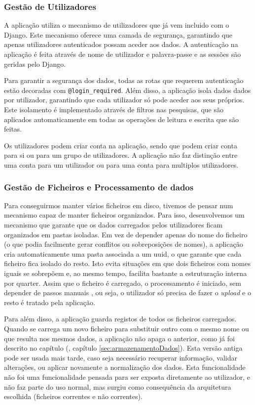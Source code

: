 \subsubsection{Gestão de Utilizadores}

A aplicação utiliza o mecanismo de utilizadores que já vem incluido com o Django. Este mecanismo oferece uma camada de segurança, garantindo que apenas utilizadores autenticados possam aceder aos dados. A autenticação na aplicação é feita através de nome de utilizador e palavra-passe e as sessões são geridas pelo Django.

Para garantir a segurança dos dados, todas as rotas que requerem autenticação estão decoradas com \texttt{@login\_required}. Além disso, a aplicação isola dados dados por utilizador, garantindo que cada utilizador só pode aceder aos seus próprios. Este isolamento é implementado através de filtros nas pesquisas, que são aplicados automaticamente em todas as operações de leitura e escrita que são feitas.

Os utilizadores podem criar conta na aplicação, sendo que podem criar conta para si ou para um grupo de utilizadores. A aplicação não faz distinção entre uma conta para um utilizador ou para uma conta para multiplos utilizadores.

\subsubsection{Gestão de Ficheiros e Processamento de dados}

Para conseguirmos manter vários ficheiros em disco, tivemos de pensar num mecanismo capaz de manter ficheiros organizados. Para isso, desenvolvemos um mecanismo que garante que os dados carregados pelos utilizadores ficam organizados em pastas isoladas. Em vez de depender apenas do nome do ficheiro (o que podia facilmente gerar conflitos ou sobreposições de nomes), a aplicação cria automaticamente uma pasta associada a um \gls{uuid}, o que garante que cada ficheiro fica isolado do resto. Isto evita situações em que dois ficheiros com nomes iguais se sobrepõem e, ao mesmo tempo, facilita bastante a estruturação interna por \gls{quarter}. Assim que o ficheiro é carregado, o processamento é iniciado, sem depender de passos manuais , ou seja, o utilizador só precisa de fazer o \textit{upload} e o resto é tratado pela aplicação.

Para além disso, a aplicação guarda registos de todos os ficheiros carregados. Quando se carrega um novo ficheiro para substituir outro com o mesmo nome ou que resulta nos mesmos dados, a aplicação não apaga o anterior, como já foi descrito no capítulo (\cf, capítulo \ref{sec:armazenamentoDados}). Esta versão antiga pode ser usada mais tarde, caso seja necessário recuperar informação, validar alterações, ou aplicar novamente a normalização dos dados. Esta funcionalidade não foi uma funcionalidade pensada para ser exposta diretamente ao utilizador, e não faz parte do uso normal, mas surgiu como consequência da arquitetura escolhida (ficheiros correntes e não correntes).

